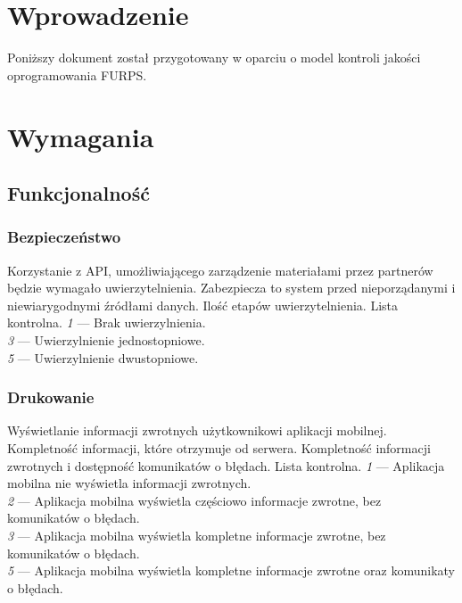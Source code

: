 \documentclass[10pt]{dokument-ppi}
\begin{document}
\MakeDokumentMeta


\section{Wprowadzenie}

Poniższy dokument został przygotowany w oparciu o model kontroli jakości
oprogramowania \textsc{FURPS}.


\section{Wymagania}

\subsection{Funkcjonalność}

\subsubsection{Bezpieczeństwo}
\begin{requirement}
    \desc%
        Korzystanie z API, umożliwiającego zarządzenie materiałami przez
        partnerów będzie wymagało uwierzytelnienia. Zabezpiecza to system przed
        nieporządanymi i niewiarygodnymi źródłami danych.
    \metric%
        Ilość etapów uwierzytelnienia.
    \tool%
        Lista kontrolna.
    \scale%
        \emph{1} --- Brak uwierzylnienia.\\
        \emph{3} --- Uwierzylnienie jednostopniowe.\\
        \emph{5} --- Uwierzylnienie dwustopniowe.
\end{requirement}

\subsubsection{Drukowanie}
\begin{requirement}
    \desc%
        Wyświetlanie informacji zwrotnych użytkownikowi aplikacji mobilnej.
        Kompletność informacji, które otrzymuje od serwera.
    \metric%
        Kompletność informacji zwrotnych i dostępność komunikatów o błędach.
    \tool%
        Lista kontrolna.
    \scale%
        \emph{1} --- Aplikacja mobilna nie wyświetla informacji zwrotnych.\\
        \emph{2} --- Aplikacja mobilna wyświetla częściowo informacje zwrotne,
            bez komunikatów o błędach.\\
        \emph{3} --- Aplikacja mobilna wyświetla kompletne informacje zwrotne,
            bez komunikatów o błędach.\\
        \emph{5} --- Aplikacja mobilna wyświetla kompletne informacje zwrotne
        oraz komunikaty o błędach.
\end{requirement}
\end{document}
